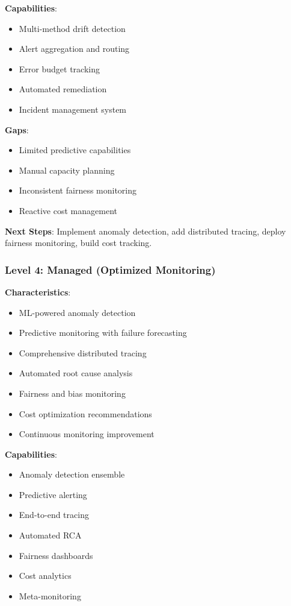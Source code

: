 \textbf{Capabilities}:
\begin{itemize}
    \item Multi-method drift detection
    \item Alert aggregation and routing
    \item Error budget tracking
    \item Automated remediation
    \item Incident management system
\end{itemize}

\textbf{Gaps}:
\begin{itemize}
    \item Limited predictive capabilities
    \item Manual capacity planning
    \item Inconsistent fairness monitoring
    \item Reactive cost management
\end{itemize}

\textbf{Next Steps}: Implement anomaly detection, add distributed tracing, deploy fairness monitoring, build cost tracking.

\subsubsection{Level 4: Managed (Optimized Monitoring)}

\textbf{Characteristics}:
\begin{itemize}
    \item ML-powered anomaly detection
    \item Predictive monitoring with failure forecasting
    \item Comprehensive distributed tracing
    \item Automated root cause analysis
    \item Fairness and bias monitoring
    \item Cost optimization recommendations
    \item Continuous monitoring improvement
\end{itemize}

\textbf{Capabilities}:
\begin{itemize}
    \item Anomaly detection ensemble
    \item Predictive alerting
    \item End-to-end tracing
    \item Automated RCA
    \item Fairness dashboards
    \item Cost analytics
    \item Meta-monitoring
\end{itemize}

